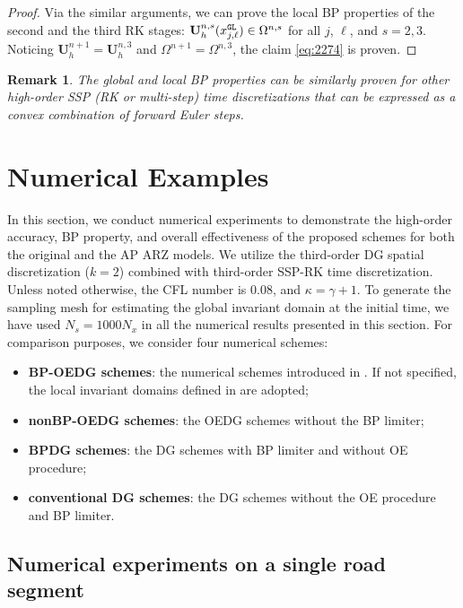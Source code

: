 \documentclass[times,final]{elsarticle}
\newtheorem{remark}{Remark}[section]
\numberwithin{equation}{section}
\theoremstyle{definition}
\theoremstyle{remark}
\newcommand{\BU}{\mathbf{U}}
\begin{document}
\begin{proof}
	Via the similar arguments, we can prove the local BP properties of the second and the third RK stages:
	$\BU^{n,s}_h(x^{\tt GL}_{j,\ell}) \in \Omega^{n,s}$ for all $j$, $\ell$, and $s = 2,3$.
	Noticing $\BU^{n+1}_h = \BU^{n,3}_h$  and $\Omega^{n+1} = \Omega^{n,3}$, the claim \eqref{eq:2274} is proven.
\end{proof}

\begin{remark}
	The global and local BP properties can be similarly proven for other high-order SSP (RK or multi-step) time discretizations that can be expressed as a convex combination of forward Euler steps.
\end{remark}

\section{Numerical Examples}\label{sec:num}

In this section, we conduct numerical experiments to demonstrate the high-order accuracy, BP property, and overall effectiveness of the proposed schemes for both the original and the AP ARZ models. 
We utilize the third-order DG spatial discretization (\( k=2 \)) combined with third-order SSP-RK time discretization. Unless noted otherwise, the CFL number is 0.08, and \( \kappa = \gamma+1 \). To generate the sampling mesh for estimating the global invariant domain at the initial time, we have used \( N_s = 1000 N_x \) in all the numerical results presented in this section. 
For comparison purposes, we consider four numerical schemes:
\begin{itemize}[topsep=3pt,itemsep=0pt,parsep=1pt,leftmargin=3mm]
	\item {\bf BP-OEDG schemes}: the numerical schemes introduced in . If not specified, the local invariant domains defined in  are adopted;
	\item {\bf nonBP-OEDG schemes}: the OEDG schemes without the BP limiter;
	\item {\bf BPDG schemes}: the DG schemes with BP limiter and without OE procedure;
	\item {\bf conventional DG schemes}: the DG schemes without the OE procedure and BP limiter.
\end{itemize}


\subsection{Numerical experiments on a single road segment}\label{sec:single}
\end{document}
